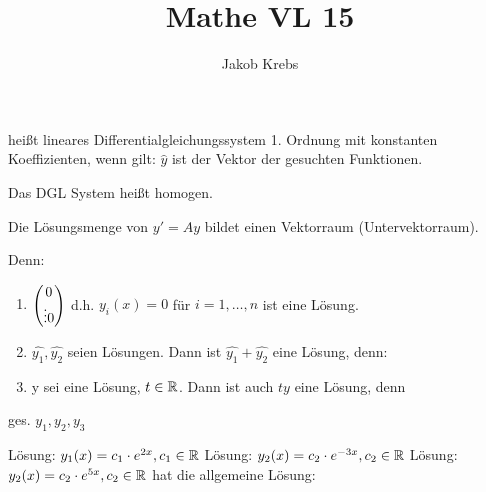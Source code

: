 \documentclass{../tudscript}
\author{Jakob Krebs}
\title{Mathe VL 15}
\begin{document}
    heißt lineares Differentialgleichungssystem 1. Ordnung mit konstanten
    Koeffizienten, wenn gilt:
    $\hat{y}$ ist der Vektor der gesuchten Funktionen.

    Das DGL System heißt homogen.

    Die Lösungsmenge von $y' = Ay$ bildet einen Vektorraum (Untervektorraum).

    Denn:
    \begin{enumerate}
        \item $\begin{pmatrix} 0 \\ \vdots 0 \end{pmatrix}$ d.h. $y_i (x) = 0$ für $i = 1, \ldots, n$ ist eine Lösung.
        \item $\hat{y_1}, \hat{y_2}$ seien Lösungen. Dann ist $\hat{y_1} + \hat{y_2}$ eine Lösung, denn:
        \item y sei eine Lösung, $t \in \mathbb{R}$. Dann ist auch $t y$ eine Lösung, denn
    \end{enumerate}
    ges. $y_1, y_2, y_3$
    
    Lösung: $y_1 (x) = c_1 \cdot e^{2x}, c_1 \in \mathbb{R}$
    Lösung: $y_2 (x) = c_2 \cdot e^{-3x}, c_2 \in \mathbb{R}$
    Lösung: $y_2 (x) = c_2 \cdot e^{5x}, c_2 \in \mathbb{R}$
        hat die allgemeine Lösung:
\end{document}
